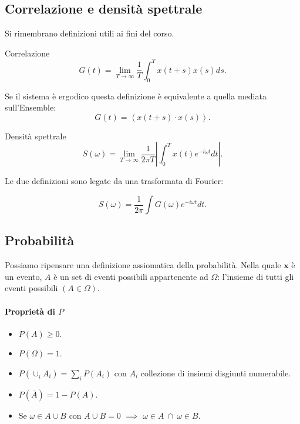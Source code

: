 \subsection{Correlazione e densità spettrale}%
\label{sub:Correlazione e densità spettrale}
Si rimembrano definizioni utili ai fini del corso. 
\begin{bluebox}{Correlazione}
    \[
        G\left(t\right)=\lim_{T \to \infty} \frac{1}{T}\int_{0}^{T} x\left(t+s\right) x\left(s\right)ds
    .\] 
\end{bluebox}
\noindent
Se il sistema è ergodico questa definizione è equivalente a quella mediata sull'Ensemble:
\[
    G( t) = \left<x(t+s) \cdot  x(s)\right>
.\] 
\begin{bluebox}{Densità spettrale}
    \[
        S\left(\omega\right) = \lim_{T \to \infty} \frac{1}{2\pi T}\left|\int_{0}^{T} x\left(t\right)e^{-i\omega t}dt \right|
    .\] 
\end{bluebox}
\noindent
Le due definizioni sono legate da una trasformata di Fourier: 
\begin{bluebox}{}
    \[
        S\left(\omega\right) = \frac{1}{2\pi}\int G\left(\omega\right)e^{-i\omega t}dt
    .\] 
\end{bluebox}



\subsection{Probabilità}%
\label{sub:Probabilità}
Possiamo ripensare una definizione assiomatica della probabilità.
%
Nella quale $\boldsymbol{x}$ è un evento, $A$ è un set di eventi possibili appartenente ad $\Omega$: l'insieme di tutti gli eventi possibili $(A \in \Omega)$.
\paragraph{Proprietà di $P$ }%
\label{par:Proprietà di P}
\begin{itemize}
    \item $P\left(A\right)\ge 0$.
    \item $P\left(\Omega\right) = 1$.
    \item $P\left(\cup_{i}^{} A_i \right) = \sum_{i}^{} P\left(A_i\right)$ con $A_i$ collezione di insiemi disgiunti numerabile.
    \item $P\left(\overline{A}\right) = 1- P\left(A\right)$.
    \item Se $\omega \in A \cup B$ con $A \cup B = 0$ $\implies$ $\omega\in A \ \cap \ \omega  \in B$.
\end{itemize}
